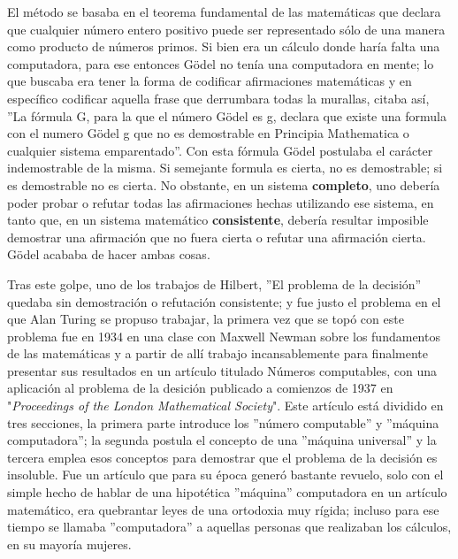 \documentclass{article}
\begin{document}
\begin{multicols}{2}
        \vspace{\baselineskip}
        
        El método se basaba en el teorema fundamental de las matemáticas que declara que cualquier número entero positivo puede ser representado sólo de una manera como producto de números primos.  Si bien era un cálculo donde haría falta una computadora, para ese entonces Gödel no tenía una computadora en mente; lo que buscaba era tener la forma de codificar afirmaciones matemáticas y en específico codificar aquella frase que derrumbara todas la murallas, citaba así, ''La fórmula G, para la que el número Gödel es g, declara que existe una formula con el numero Gödel g que no es demostrable en Principia Mathematica o cualquier sistema emparentado''.  Con esta fórmula Gödel postulaba el carácter indemostrable de la misma. Si semejante formula es cierta, no es demostrable; si es demostrable no es cierta. No obstante, en un sistema \textbf{completo}, uno debería poder probar o refutar todas las afirmaciones hechas utilizando ese sistema, en tanto que, en un sistema matemático \textbf{consistente}, debería resultar imposible demostrar una afirmación que no fuera cierta o refutar una afirmación cierta. Gödel acababa de hacer ambas cosas.\cite{turing}
        
        \vspace{\baselineskip}
        
        Tras este golpe, uno de los trabajos de Hilbert, ''El problema de la decisión'' quedaba sin demostración o refutación consistente; y fue justo el problema en el que Alan Turing se propuso trabajar, la primera vez que se topó con este problema fue en 1934 en una clase con Maxwell Newman sobre los fundamentos de las matemáticas y a partir de allí trabajo incansablemente para finalmente presentar sus resultados en un artículo titulado {Números computables, con una aplicación al problema de la desición} publicado a comienzos de 1937 en "\textit{Proceedings of the London Mathematical Society}". Este artículo está dividido en tres secciones, la primera parte introduce los ''número computable'' y ''máquina computadora''; la segunda postula el concepto de una ''máquina universal'' y la tercera emplea esos conceptos para demostrar que el problema de la decisión es insoluble.  Fue un artículo que para su época generó bastante revuelo, solo con el simple hecho de hablar de una hipotética ''máquina'' computadora en un artículo matemático, era quebrantar leyes de una ortodoxia muy rígida; incluso para ese tiempo se llamaba ''computadora'' a aquellas personas que realizaban los cálculos, en su mayoría mujeres.\cite{turing}
        

\end{multicols}
\end{document}
